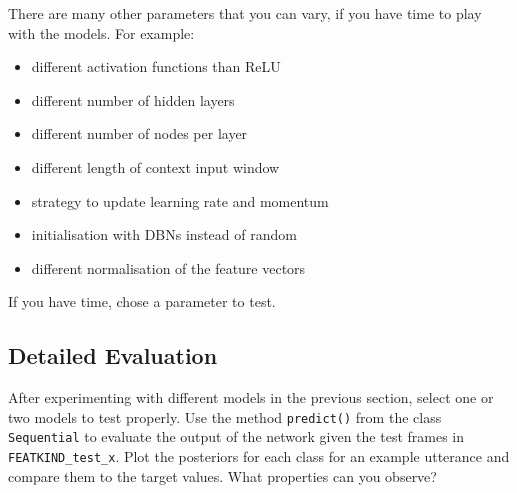 \documentclass{nada-ten}
\begin{document}
There are many other parameters that you can vary, if you have time to play with the models. For example:
\begin{itemize}
\item different activation functions than ReLU
\item different number of hidden layers
\item different number of nodes per layer
\item different length of context input window
\item strategy to update learning rate and momentum
\item initialisation with DBNs instead of random
\item different normalisation of the feature vectors
\end{itemize}
If you have time, chose a parameter to test.
%
%

\subsection{Detailed Evaluation}
After experimenting with different models in the previous section, select one or two models to test properly. Use the method \texttt{predict()} from the class \texttt{Sequential} to evaluate the output of the network given the test frames in \texttt{FEATKIND\_test\_x}. Plot the posteriors for each class for an example utterance and compare them to the target values. What properties can you observe?
\end{document}
